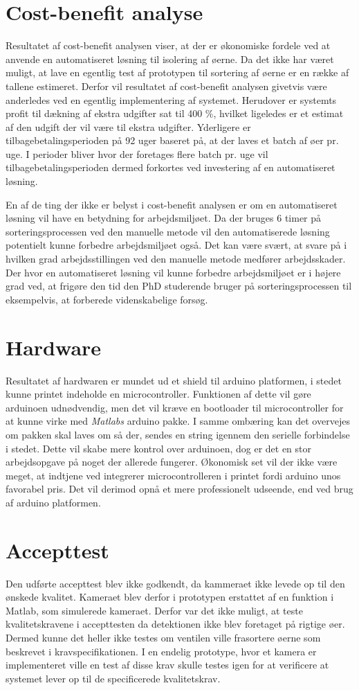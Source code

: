 \section{Cost-benefit analyse}
Resultatet af cost-benefit analysen viser, at der er økonomiske fordele ved at anvende en automatiseret løsning til isolering af øerne. Da det ikke har været muligt, at lave en egentlig test af prototypen til sortering af øerne er en række af tallene estimeret. Derfor vil resultatet af cost-benefit analysen givetvis være anderledes ved en egentlig implementering af systemet. Herudover er systemts profit til dækning af ekstra udgifter sat til 400 \%, hvilket ligeledes er et estimat af den udgift der vil være til ekstra udgifter. Yderligere er tilbagebetalingsperioden på 92 uger baseret på, at der laves et batch af øer pr. uge. I perioder bliver hvor der foretages flere batch pr. uge vil tilbagebetalingsperioden dermed forkortes ved investering af en automatiseret løsning.

En af de ting der ikke er belyst i cost-benefit analysen er om en automatiseret løsning vil have en betydning for arbejdsmiljøet. Da der bruges 6 timer på sorteringsprocessen ved den manuelle metode vil den automatiserede løsning potentielt kunne forbedre arbejdsmiljøet også. Det kan være svært, at svare på i hvilken grad arbejdsstillingen ved den manuelle metode medfører arbejdsskader. Der hvor en automatiseret løsning vil kunne forbedre arbejdsmiljøet er i højere grad ved, at frigøre den tid den PhD studerende bruger på sorteringsprocessen til eksempelvis, at forberede videnskabelige forsøg.

\section{Hardware}
Resultatet af hardwaren er mundet ud et shield til arduino platformen, i stedet kunne printet indeholde en microcontroller. Funktionen af dette vil gøre arduinoen udnødvendig, men det vil kræve en bootloader til microcontroller for at kunne virke med \textit{Matlabs} arduino pakke. I samme ombæring kan det overvejes om pakken skal laves om så der, sendes en string igennem den serielle forbindelse i stedet. Dette vil skabe mere kontrol over arduinoen, dog er det en stor arbejdsopgave på noget der allerede fungerer. Økonomisk set vil der ikke være meget, at indtjene ved integrerer microcontrolleren i printet fordi arduino unos favorabel pris. Det vil derimod opnå et mere professionelt udseende, end ved brug af arduino platformen.

\section{Accepttest}
Den udførte accepttest blev ikke godkendt, da kammeraet ikke levede op til den ønskede kvalitet. Kameraet blev derfor i prototypen erstattet af en funktion i Matlab, som simulerede kameraet. Derfor var det ikke muligt, at teste kvalitetskravene i accepttesten da detektionen ikke blev foretaget på rigtige øer. Dermed kunne det heller ikke testes om ventilen ville frasortere øerne som beskrevet i kravspecifikationen. I en endelig prototype, hvor et kamera er implementeret ville en test af disse krav skulle testes igen for at verificere at systemet lever op til de specificerede kvalitetskrav. 